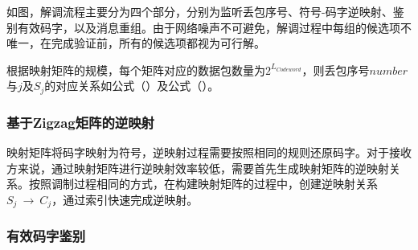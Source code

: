 如图，解调流程主要分为四个部分，分别为监听丢包序号、符号-码字逆映射、鉴别有效码字，以及消息重组。由于网络噪声不可避免，解调过程中每组的候选项不唯一，在完成验证前，所有的候选项都视为可行解。


根据映射矩阵的规模，每个矩阵对应的数据包数量为$2^{L_{Codeword}}$，则丢包序号$number$与$j$及$S_{j}$的对应关系如公式（）及公式（）。

\subsubsection{基于Zigzag矩阵的逆映射}
\label{chap:zigzag:model:demodulation:reverse-mapping}

映射矩阵将码字映射为符号，逆映射过程需要按照相同的规则还原码字。对于接收方来说，通过映射矩阵进行逆映射效率较低，需要首先生成映射矩阵的逆映射关系。按照调制过程相同的方式，在构建映射矩阵的过程中，创建逆映射关系$S_{j}\ \rightarrow\ C_{j}$，通过索引快速完成逆映射。

\subsubsection{有效码字鉴别}
\label{chap:zigzag:model:demodulation:identification}



